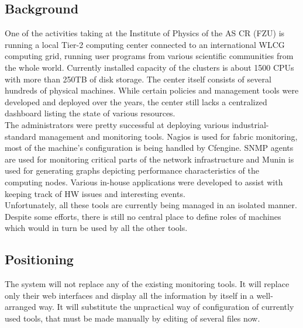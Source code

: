 \documentclass[12pt]{article}
\begin{document}
\subsection{Background}
One of the activities taking at the Institute of Physics of the AS CR (FZU) is running a local Tier-2 computing center connected to 
an international WLCG computing grid, running user programs from various scientific communities from the whole world. Currently 
installed capacity of the clusters is about 1500 CPUs with more than 250TB of disk storage. The center itself consists of several 
hundreds of physical machines. While certain policies and management tools were developed and deployed over the years, the center 
still lacks a centralized dashboard listing the state of various resources.\\
The administrators were pretty successful at deploying various industrial-standard management and monitoring tools. Nagios is used 
for fabric monitoring, most of the machine's configuration is being handled by Cfengine. SNMP agents are used for monitoring 
critical parts of the network infrastructure and Munin is used for generating graphs depicting performance characteristics of the 
computing nodes. Various in-house applications were developed to assist with keeping track of HW issues and interesting events.\\
Unfortunately, all these tools are currently being managed in an isolated manner. Despite some efforts, there is still no central 
place to define roles of machines which would in turn be used by all the other tools.

 
\subsection{Positioning}
The system will not replace any of the existing monitoring tools. It will replace only their web interfaces and display all the 
information by itself in a well-arranged way. It will substitute the unpractical way of configuration of currently used tools, 
that must be made manually by editing of several files now.
\end{document}
